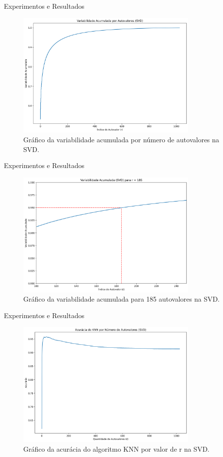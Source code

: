 \documentclass{beamer}
\theoremstyle{definition}
\begin{document}
\begin{frame}{Experimentos e Resultados}
\begin{figure}[H]
  \centering
  \caption{Gráfico da variabilidade acumulada por número de autovalores na SVD.}
  \includegraphics[width=9cm]{var_acu_svd}
\end{figure}
\end{frame}

\begin{frame}{Experimentos e Resultados}
\begin{figure}[H]
  \centering
  \caption{Gráfico da variabilidade acumulada para 185 autovalores na SVD.}
  \includegraphics[width=9cm]{var_acu_svd_185}
\end{figure}
\end{frame}

\begin{frame}{Experimentos e Resultados}
\begin{figure}[H]
  \centering
  \caption{Gráfico da acurácia do algoritmo KNN por valor de r na SVD.}
  \includegraphics[width=9cm]{acuracia_svd}
\end{figure}
\end{frame}
\end{document}
